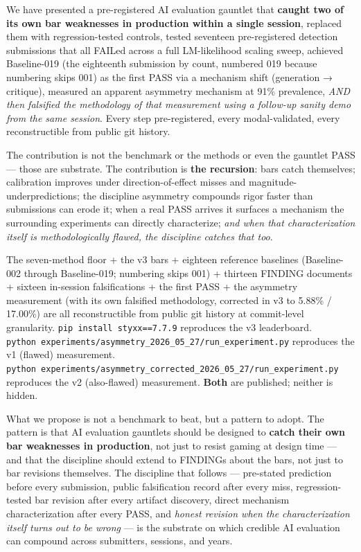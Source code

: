 \documentclass[
]{article}
\begin{document}
We have presented a pre-registered AI evaluation gauntlet that
\textbf{caught two of its own bar weaknesses in production within a
single session}, replaced them with regression-tested controls, tested
seventeen pre-registered detection submissions that all FAILed across a
full LM-likelihood scaling sweep, achieved Baseline-019 (the eighteenth
submission by count, numbered 019 because numbering skips 001) as the
first PASS via a mechanism shift (generation → critique), measured an
apparent asymmetry mechanism at 91\% prevalence, \emph{AND then
falsified the methodology of that measurement using a follow-up sanity
demo from the same session}. Every step pre-registered, every
modal-validated, every reconstructible from public git history.

The contribution is not the benchmark or the methods or even the
gauntlet PASS --- those are substrate. The contribution is \textbf{the
recursion}: bars catch themselves; calibration improves under
direction-of-effect misses and magnitude-underpredictions; the
discipline asymmetry compounds rigor faster than submissions can erode
it; when a real PASS arrives it surfaces a mechanism the surrounding
experiments can directly characterize; \emph{and when that
characterization itself is methodologically flawed, the discipline
catches that too}.

The seven-method floor + the v3 bars + eighteen reference baselines
(Baseline-002 through Baseline-019; numbering skips 001) + thirteen
FINDING documents + sixteen in-session falsifications + the first PASS +
the asymmetry measurement (with its own falsified methodology, corrected
in v3 to 5.88\% / 17.00\%) are all reconstructible from public git
history at commit-level granularity. \texttt{pip\ install\ styxx==7.7.9}
reproduces the v3 leaderboard.
\texttt{python\ experiments/asymmetry\_2026\_05\_27/run\_experiment.py}
reproduces the v1 (flawed) measurement.
\texttt{python\ experiments/asymmetry\_corrected\_2026\_05\_27/run\_experiment.py}
reproduces the v2 (also-flawed) measurement. \textbf{Both} are
published; neither is hidden.

What we propose is not a benchmark to beat, but a pattern to adopt. The
pattern is that AI evaluation gauntlets should be designed to
\textbf{catch their own bar weaknesses in production}, not just to
resist gaming at design time --- and that the discipline should extend
to FINDINGs about the bars, not just to bar revisions themselves. The
discipline that follows --- pre-stated prediction before every
submission, public falsification record after every miss,
regression-tested bar revision after every artifact discovery, direct
mechanism characterization after every PASS, and \emph{honest revision
when the characterization itself turns out to be wrong} --- is the
substrate on which credible AI evaluation can compound across
submitters, sessions, and years.
\end{document}

